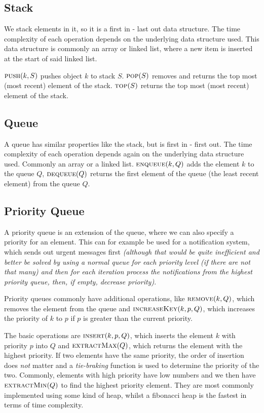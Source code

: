 \subsection{Stack}
We stack elements in it, so it is a first in - last out data structure. The time complexity of each operation depends on the underlying data structure used.
This data structure is commonly an array or linked list, where a new item is inserted at the start of said linked list.

 $\textsc{push}(k, S)$ pushes object $k$ to stack $S$. $\textsc{pop}(S)$ removes and returns the top most (most recent) element of the stack. $\textsc{top}(S)$ returns the top most (most recent) element of the stack.

\subsection{Queue}
A queue has similar properties like the stack, but is first in - first out. The time complexity of each operation depends again on the underlying data structure used. Commonly an array or a linked list.
 $\textsc{enqueue}(k, Q)$ adds the element $k$ to the queue $Q$, $\textsc{dequeue}(Q)$ returns the first element of the queue (the least recent element) from the queue $Q$.

\subsection{Priority Queue}
A priority queue is an extension of the queue, where we can also specify a priority for an element. This can for example be used for a notification system, which sends out urgent messages first \textit{(although that would be quite inefficient and better be solved by using a normal queue for each priority level (if there are not that many) and then for each iteration process the notifications from the highest priority queue, then, if empty, decrease priority)}.

 Priority queues commonly have additional operations, like $\textsc{remove}(k, Q)$, which removes the element from the queue and $\textsc{increaseKey}(k, p, Q)$, which increases the priority of $k$ to $p$ if $p$ is greater than the current priority.

The basic operations are $\textsc{insert}(k, p, Q)$, which inserts the element $k$ with priority $p$ into $Q$ and $\textsc{extractMax}(Q)$, which returns the element with the highest priority.
If two elements have the same priority, the order of insertion does \textit{not} matter and a \textit{tie-braking} function is used to determine the priority of the two.
Commonly, elements with high priority have low numbers and we then have $\textsc{extractMin}(Q)$ to find the highest priority element.
They are most commonly implemented using some kind of heap, whilst a fibonacci heap is the fastest in terms of time complexity.

